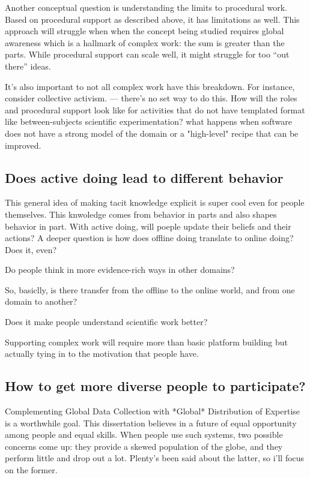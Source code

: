 Another conceptual question is understanding the limits to procedural work. Based on procedural support as described above, it has limitations as well. This approach will struggle when when the concept being studied requires global awareness which is a hallmark of complex work: the sum is greater than the parts.  While procedural support can scale well, it might struggle for too “out there” ideas.

It's also important to not all complex work have this breakdown. For instance, consider collective activism. — there’s no set way to do this. How will the roles and procedural support look like for activities that do not have templated format like between-subjects scientific experimentation?  what happens when software does not have a strong model of the domain or a "high-level" recipe that can be improved.


\subsection{Does active doing lead to different behavior}
This general idea of making tacit knowledge explicit is super cool even for people themselves. This knwoledge comes from behavior in parts and also shapes behavior in part. With active doing, will poeple update their beliefs and their actions? A deeper question is how does offline doing translate to online doing? Does it, even?

Do people think in more evidence-rich ways in other domains?

So, basiclly, is there transfer from the offline to the online world, and from one domain to another?

Does it make people understand scientific work better?

Supporting complex work will require more than basic platform building but actually tying in to the motivation that people have.

\subsection{How to get more diverse people to participate?}

Complementing Global Data Collection with *Global* Distribution of Expertise is a worthwhile goal. This dissertation believes in a future of equal opportunity among people and equal skills. When people use such systems, two possible concerns come up: they provide a skewed population of the globe, and they perform little and drop out a lot. Plenty's been said about the latter, so i'll focus on the former.

